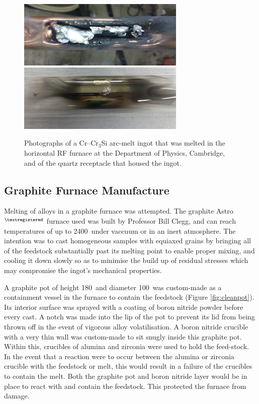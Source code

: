 %
\begin{figure}[H]
\begin{center}
\includegraphics[width=8cm]{physicsrf}
\includegraphics[width=8cm]{physicsrfii}
\caption{Photographs of a Cr--Cr$_3$Si arc-melt ingot that was melted in the horizontal RF furnace at the Department of Physics, Cambridge, and of the quartz receptacle that housed the ingot.}
\label{fig:physicsrf}
\end{center}
\end{figure}
%

\subsection{Graphite Furnace Manufacture}

Melting of alloys in a graphite furnace was attempted.  The graphite Astro$^{\textregistered}$ furnace used was built by Professor Bill Clegg, and can reach temperatures of up to 2400\celsius\ under vaccuum or in an inert atmosphere.  The intention was to cast homogeneous samples with equiaxed grains by bringing all of the feedstock substantially past its melting point to enable proper mixing, and cooling it down slowly so as to minimise the build up of residual stresses which may compromise the ingot's mechanical properties.  

A graphite pot of height 180\milli\metre\ and diameter 100\milli\metre\ was custom-made as a containment vessel in the furnace to contain the feedstock (Figure \ref{fig:cleanpot}).  Its interior surface was sprayed with a coating of boron nitride powder before every cast.  A notch was made into the lip of the pot to prevent its lid from being thrown off in the event of vigorous alloy volatilisation.  A boron nitride crucible with a very thin wall was custom-made to sit snugly inside this graphite pot.  Within this, crucibles of alumina and zirconia were used to hold the feed-stock.  In the event that a reaction were to occur between the alumina or zirconia crucible with the feedstock or melt, this would result in a failure of the crucibles to contain the melt.  Both the graphite pot and boron nitride layer would be in place to react with and contain the feedstock.  This protected the furnace from damage.

